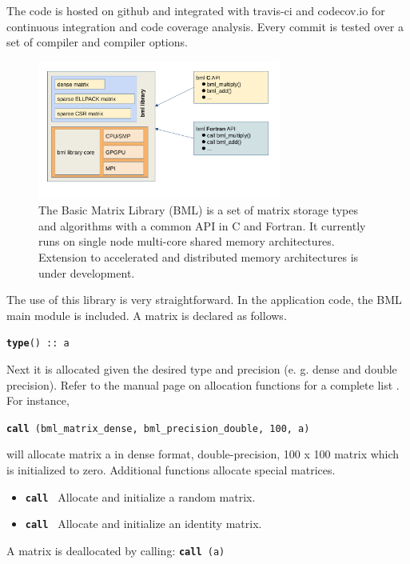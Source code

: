 The code is hosted on github \cite{bml} and integrated with travis-ci and codecov.io for continuous integration and code coverage analysis. Every commit is tested over a set of compiler and compiler options.

\begin{center}
  \begin{figure}
    \includegraphics[width=8.0cm]{./fig/bml_scheme.pdf}
    \caption{The Basic Matrix Library (BML) is a set of matrix storage types and algorithms with a common API in C and Fortran. It currently runs on single node multi-core shared memory architectures. Extension to accelerated and distributed memory architectures is under development.
    }
    \label{bmlarch}
  \end{figure} 
\end{center}

The use of this library is very straightforward. In the application code, the BML main module is included. A matrix is declared as follows.  


  \texttt{\textbf{type}() :: a} 


Next it is allocated given the desired type and precision (e. g. dense and double precision). 
Refer to the manual page on allocation functions for a complete list \cite{bml}. For instance,
%

  \texttt{\textbf{call} (bml\_matrix\_dense, bml\_precision\_double, 100, a)}

%
will allocate matrix a in dense format, double-precision, 100 x 100 matrix which is initialized to zero. Additional functions allocate
special matrices.
%
\begin{itemize}
  \item \texttt{\textbf{call} } Allocate and initialize a random matrix.
  \item \texttt{\textbf{call} } Allocate and initialize an identity matrix.
\end{itemize}
%
A matrix is deallocated by calling:
\texttt{\textbf{call} (a)}


